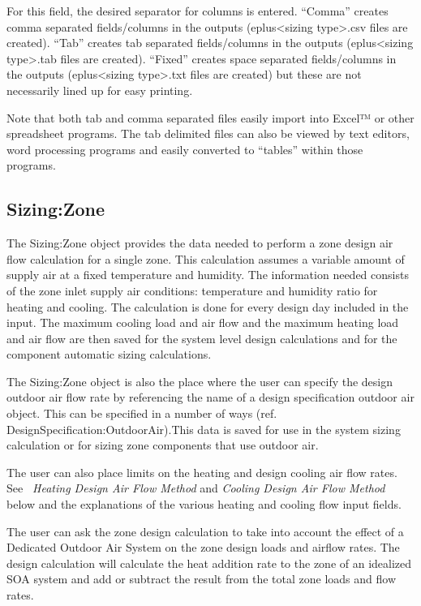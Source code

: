For this field, the desired separator for columns is entered. ``Comma'' creates comma separated fields/columns in the outputs (eplus\textless{}sizing type\textgreater{}.csv files are created). ``Tab'' creates tab separated fields/columns in the outputs (eplus\textless{}sizing type\textgreater{}.tab files are created). ``Fixed'' creates space separated fields/columns in the outputs (eplus\textless{}sizing type\textgreater{}.txt files are created) but these are not necessarily lined up for easy printing.

Note that both tab and comma separated files easily import into Excel™ or other spreadsheet programs. The tab delimited files can also be viewed by text editors, word processing programs and easily converted to ``tables'' within those programs.

\subsection{Sizing:Zone}\label{sizingzone}

The Sizing:Zone object provides the data needed to perform a zone design air flow calculation for a single zone. This calculation assumes a variable amount of supply air at a fixed temperature and humidity. The information needed consists of the zone inlet supply air conditions: temperature and humidity ratio for heating and cooling. The calculation is done for every design day included in the input. The maximum cooling load and air flow and the maximum heating load and air flow are then saved for the system level design calculations and for the component automatic sizing calculations.

The Sizing:Zone object is also the place where the user can specify the design outdoor air flow rate by referencing the name of a design specification outdoor air object. This can be specified in a number of ways (ref. DesignSpecification:OutdoorAir).This data is saved for use in the system sizing calculation or for sizing zone components that use outdoor air.

The user can also place limits on the heating and design cooling air flow rates. See \emph{~Heating Design Air Flow Method} and \emph{Cooling Design Air Flow Method} below and the explanations of the various heating and cooling flow input fields.

The user can ask the zone design calculation to take into account the effect of a Dedicated Outdoor Air System on the zone design loads and airflow rates. The design calculation will calculate the heat addition rate to the zone of an idealized SOA system and add or subtract the result from the total zone loads and flow rates.

